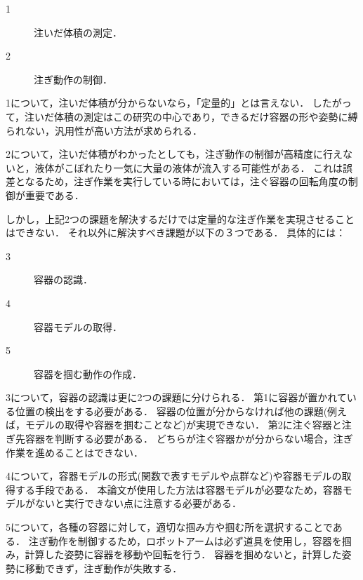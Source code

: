 \begin{description}
  \item[1] 注いだ体積の測定．\label{enum:main-purpose1}
  \item[2] 注ぎ動作の制御．\label{enum:main-purpose2}
\end{description}

\par1について，注いだ体積が分からないなら，「定量的」とは言えない．
したがって，注いだ体積の測定はこの研究の中心であり，できるだけ容器の形や姿勢に縛られない，汎用性が高い方法が求められる．

\par2について，注いだ体積がわかったとしても，注ぎ動作の制御が高精度に行えないと，液体がこぼれたり一気に大量の液体が流入する可能性がある．
これは誤差となるため，注ぎ作業を実行している時においては，注ぐ容器の回転角度の制御が重要である．

しかし，上記2つの課題を解決するだけでは定量的な注ぎ作業を実現させることはできない．
それ以外に解決すべき課題が以下の３つである．
具体的には：

\begin{description}
  \item[3] 容器の認識．	\label{enum:sub-purpose1}
  \item[4] 容器モデルの取得．\label{enum:sub-purpose2}
  \item[5] 容器を掴む動作の作成．	\label{enum:sub-purpose3}
\end{description}

\par3について，容器の認識は更に2つの課題に分けられる．
第1に容器が置かれている位置の検出をする必要がある．
容器の位置が分からなければ他の課題(例えば，モデルの取得や容器を掴むことなど)が実現できない．
第2に注ぐ容器と注ぎ先容器を判断する必要がある．
どちらが注ぐ容器かが分からない場合，注ぎ作業を進めることはできない．

\par4について，容器モデルの形式(関数で表すモデルや点群など)や容器モデルの取得する手段である．
本論文が使用した方法は容器モデルが必要なため，容器モデルがないと実行できない点に注意する必要がある．

\par5について，各種の容器に対して，適切な掴み方や掴む所を選択することである．
注ぎ動作を制御するため，ロボットアームは必ず道具を使用し，容器を掴み，計算した姿勢に容器を移動や回転を行う．
容器を掴めないと，計算した姿勢に移動できず，注ぎ動作が失敗する．

